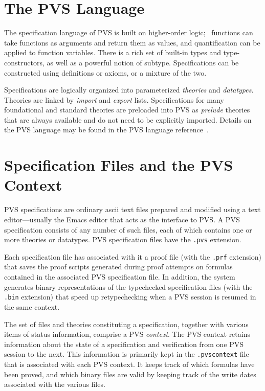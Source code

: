 \section*{The PVS Language}

The specification language of PVS is built on higher-order logic; \ie\
functions can take functions as arguments and return them as values, and
quantification can be applied to function variables.  There is a rich set
of built-in types and type-constructors, as well as a powerful notion of
subtype.  Specifications can be constructed using definitions or axioms,
or a mixture of the two.

Specifications are logically organized into parameterized
\emph{theories} and \emph{datatypes}.
Theories are linked by \emph{import} and \emph{export} lists.
Specifications for many foundational and standard theories are preloaded
into PVS as \emph{prelude}\index{prelude}\index{PVS!prelude} theories that
are always available and do not need to be explicitly imported.  Details
on the PVS language may be found in the PVS language
reference~\cite{PVS:language}.

\section*{Specification Files and the PVS Context}

PVS specifications are ordinary {\sc ascii} text files prepared and
modified using a text editor---usually the Emacs editor that acts as the
interface to PVS.  A PVS specification consists of any number of such
files, each of which contains one or more theories or datatypes.  PVS
specification files have the \texttt{.pvs} extension.

Each specification file has associated with it a proof file (with the
\texttt{.prf} extension) that saves the proof scripts generated during
proof attempts on formulas contained in the associated PVS specification
file.
In addition, the system generates binary representations of the
typechecked specification files (with the \texttt{.bin} extension) that
speed up retypechecking when a PVS session is resumed in the same
context.

The set of files and theories constituting a specification, together with
various items of status information, comprise a PVS
\emph{context}. The PVS context retains information
about the state of a specification and verification from one PVS session
to the next.  This information is primarily kept in the
\texttt{.pvscontext} file that is associated with each PVS context.  It
keeps track of which formulas have been proved, and which binary files are
valid by keeping track of the write dates associated with the various
files.

